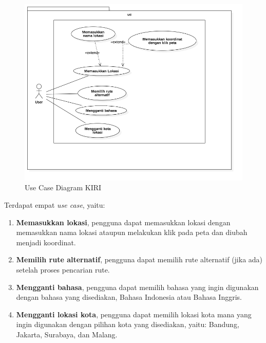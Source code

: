 \begin{figure}[H]
	\centering
	\includegraphics[scale=0.5]{Gambar/usecase}
	\caption{Use Case Diagram KIRI} 
	\label{fig:3_usecase}
\end{figure}

Terdapat empat \textit{use case}, yaitu:
\begin{enumerate}
	\item \textbf{Memasukkan lokasi}, pengguna dapat memasukkan lokasi dengan memasukkan nama lokasi ataupun melakukan klik pada peta dan diubah menjadi koordinat.
	\item \textbf{Memilih rute alternatif}, pengguna dapat memilih rute alternatif (jika ada) setelah proses pencarian rute.
	\item \textbf{Mengganti bahasa}, pengguna dapat memilih bahasa yang ingin digunakan dengan bahasa yang disediakan, Bahasa Indonesia atau Bahasa Inggris.
	\item \textbf{Mengganti lokasi kota}, pengguna dapat memilih lokasi kota mana yang ingin digunakan dengan pilihan kota yang disediakan, yaitu: Bandung, Jakarta, Surabaya, dan Malang.
	
\end{enumerate}

